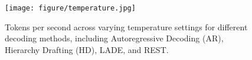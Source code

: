 \begin{figure}[ht!]
\centering
\texttt{[image: figure/temperature.jpg]}
\vspace{-.8em}
\caption{\small Tokens per second across varying temperature settings for different decoding methods, including Autoregressive Decoding (AR), Hierarchy Drafting (HD), LADE, and REST.}
\label{fig:temperature}
\end{figure}